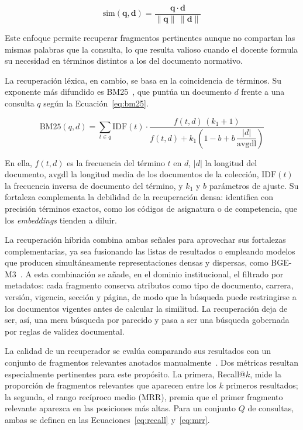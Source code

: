 \begin{equation}
\label{eq:coseno}
\mathrm{sim}(\mathbf{q}, \mathbf{d}) = \frac{\mathbf{q} \cdot \mathbf{d}}{\lVert \mathbf{q} \rVert \, \lVert \mathbf{d} \rVert}
\end{equation}

Este enfoque permite recuperar fragmentos pertinentes aunque no compartan las mismas palabras que la consulta, lo que resulta valioso cuando el docente formula su necesidad en términos distintos a los del documento normativo.

La recuperación léxica, en cambio, se basa en la coincidencia de términos. Su exponente más difundido es BM25~\cite{robertson2009bm25}, que puntúa un documento $d$ frente a una consulta $q$ según la Ecuación~\ref{eq:bm25}.

\begin{equation}
\label{eq:bm25}
\mathrm{BM25}(q, d) = \sum_{t \in q} \mathrm{IDF}(t) \cdot \frac{f(t, d)\,(k_1 + 1)}{f(t, d) + k_1 \left(1 - b + b \, \dfrac{|d|}{\mathrm{avgdl}}\right)}
\end{equation}

En ella, $f(t, d)$ es la frecuencia del término $t$ en $d$, $|d|$ la longitud del documento, $\mathrm{avgdl}$ la longitud media de los documentos de la colección, $\mathrm{IDF}(t)$ la frecuencia inversa de documento del término, y $k_1$ y $b$ parámetros de ajuste. Su fortaleza complementa la debilidad de la recuperación densa: identifica con precisión términos exactos, como los códigos de asignatura o de competencia, que los \textit{embeddings} tienden a diluir.

La recuperación híbrida combina ambas señales para aprovechar sus fortalezas complementarias, ya sea fusionando las listas de resultados o empleando modelos que producen simultáneamente representaciones densas y dispersas, como BGE-M3~\cite{chen2024bgem3}. A esta combinación se añade, en el dominio institucional, el filtrado por metadatos: cada fragmento conserva atributos como tipo de documento, carrera, versión, vigencia, sección y página, de modo que la búsqueda puede restringirse a los documentos vigentes antes de calcular la similitud. La recuperación deja de ser, así, una mera búsqueda por parecido y pasa a ser una búsqueda gobernada por reglas de validez documental.

La calidad de un recuperador se evalúa comparando sus resultados con un conjunto de fragmentos relevantes anotados manualmente~\cite{manning2008ir}. Dos métricas resultan especialmente pertinentes para este propósito. La primera, Recall@$k$, mide la proporción de fragmentos relevantes que aparecen entre los $k$ primeros resultados; la segunda, el rango recíproco medio (MRR), premia que el primer fragmento relevante aparezca en las posiciones más altas. Para un conjunto $Q$ de consultas, ambas se definen en las Ecuaciones~\ref{eq:recall} y~\ref{eq:mrr}.

